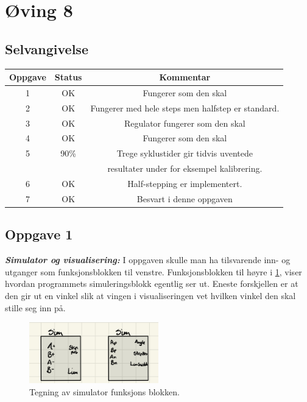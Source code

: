 \section{Øving 8}
\subsection{Selvangivelse}

\begin{center}
\begin{tabular}{ |c|c|c|}
\hline
Oppgave & Status & Kommentar \\
\hline
1 & OK & Fungerer som den skal \\ 
\hline
2 & OK & Fungerer med hele steps men halfstep er standard. \\  
\hline
3 & OK & Regulator fungerer som den skal \\
\hline
4 & OK & Fungerer som den skal \\
\hline
5 & 90\% & Trege syklustider gir tidvis uventede  \\
& & resultater under for eksempel kalibrering. \\
\hline
6 & OK & Half-stepping er implementert. \\
\hline
7 & OK & Besvart i denne oppgaven \\
\hline
\end{tabular}
\label{tab:Parameters}
\end{center}

\subsection{Oppgave 1}
\textbf{\textit{ Simulator og visualisering: }}
\newline
I oppgaven skulle man ha tilsvarende inn- og utganger som funksjonsblokken til venstre. Funksjonsblokken til høyre i \ref{fig:Simulator}, viser hvordan programmets simuleringsblokk egentlig ser ut. Eneste forskjellen er at den gir ut en vinkel slik at vingen i visualiseringen vet hvilken vinkel den skal stille seg inn på.

\begin{figure}[h!]
    \centering
    \includegraphics[width = 0.5\textwidth]{Images/Simulator.jpeg}
    \caption{Tegning av simulator funksjons blokken.}
    \label{fig:Simulator}
\end{figure}


